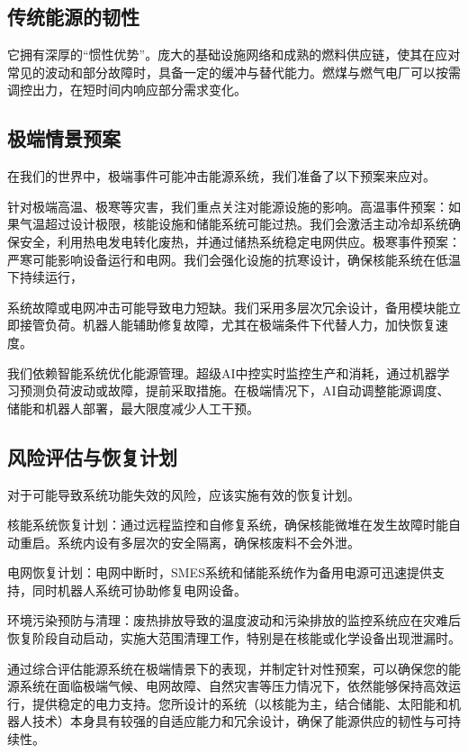 \subsection{传统能源的韧性}\label{ux4f20ux7edfux80fdux6e90ux7684ux97e7ux6027}

它拥有深厚的``惯性优势''。庞大的基础设施网络和成熟的燃料供应链，使其在应对常见的波动和部分故障时，具备一定的缓冲与替代能力。燃煤与燃气电厂可以按需调控出力，在短时间内响应部分需求变化。

\subsection{极端情景预案}\label{ux6781ux7aefux60c5ux666fux9884ux6848}

在我们的世界中，极端事件可能冲击能源系统，我们准备了以下预案来应对。

针对极端高温、极寒等灾害，我们重点关注对能源设施的影响。高温事件预案：如果气温超过设计极限，核能设施和储能系统可能过热。我们会激活主动冷却系统确保安全，利用热电发电转化废热，并通过储热系统稳定电网供应。极寒事件预案：严寒可能影响设备运行和电网。我们会强化设施的抗寒设计，确保核能系统在低温下持续运行，

系统故障或电网冲击可能导致电力短缺。我们采用多层次冗余设计，备用模块能立即接管负荷。机器人能辅助修复故障，尤其在极端条件下代替人力，加快恢复速度。

我们依赖智能系统优化能源管理。超级AI中控实时监控生产和消耗，通过机器学习预测负荷波动或故障，提前采取措施。在极端情况下，AI自动调整能源调度、储能和机器人部署，最大限度减少人工干预。

\subsection{风险评估与恢复计划}\label{ux98ceux9669ux8bc4ux4f30ux4e0eux6062ux590dux8ba1ux5212}

对于可能导致系统功能失效的风险，应该实施有效的恢复计划。

核能系统恢复计划：通过远程监控和自修复系统，确保核能微堆在发生故障时能自动重启。系统内设有多层次的安全隔离，确保核废料不会外泄。

电网恢复计划：电网中断时，SMES系统和储能系统作为备用电源可迅速提供支持，同时机器人系统可协助修复电网设备。

环境污染预防与清理：废热排放导致的温度波动和污染排放的监控系统应在灾难后恢复阶段自动启动，实施大范围清理工作，特别是在核能或化学设备出现泄漏时。

通过综合评估能源系统在极端情景下的表现，并制定针对性预案，可以确保您的能源系统在面临极端气候、电网故障、自然灾害等压力情况下，依然能够保持高效运行，提供稳定的电力支持。您所设计的系统（以核能为主，结合储能、太阳能和机器人技术）本身具有较强的自适应能力和冗余设计，确保了能源供应的韧性与可持续性。

